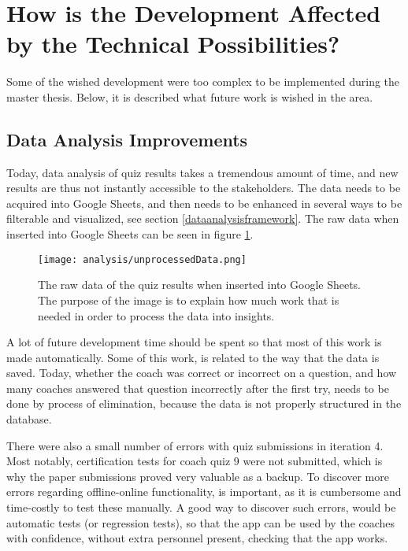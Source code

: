 \section{How is the Development Affected by the Technical Possibilities?}\label{rq1}

Some of the wished development were too complex to be implemented during the master thesis. Below, it is described what future work is wished in the area.

\subsection{Data Analysis Improvements}
Today, data analysis of quiz results takes a tremendous amount of time, and new results are thus not instantly accessible to the stakeholders. The data needs to be acquired into Google Sheets, and then needs to be enhanced in several ways to be filterable and visualized, see section \ref{dataanalysisframework}. The raw data when inserted into Google Sheets can be seen in figure \ref{fig:unprocessedData}.

\begin{figure}[h]
  \centering
  \texttt{[image: analysis/unprocessedData.png]}
  \caption{The raw data of the quiz results when inserted into Google Sheets. The purpose of the image is to explain how much work that is needed in order to process the data into insights.}
  \label{fig:unprocessedData}
\end{figure}

A lot of future development time should be spent so that most of this work is made automatically. Some of this work, is related to the way that the data is saved. Today, whether the coach was correct or incorrect on a question, and how many coaches answered that question incorrectly after the first try, needs to be done by process of elimination, because the data is not properly structured in the database.

There were also a small number of errors with quiz submissions in iteration 4. Most notably, certification tests for coach quiz 9 were not submitted, which is why the paper submissions proved very valuable as a backup. To discover more errors regarding offline-online functionality, is important, as it is cumbersome and time-costly to test these manually. A good way to discover such errors, would be automatic tests (or regression tests), so that the app can be used by the coaches with confidence, without extra personnel present, checking that the app works.

